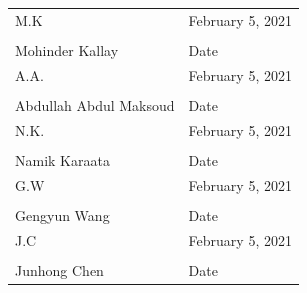 \documentclass[]{article}
\begin{document}
	\noindent\begin{tabular}{ll}\\
	M.K & February 5, 2021 \\
	\makebox[2.5in]{\hrulefill} & \makebox[2.5in]			{\hrulefill}\\
	Mohinder Kallay & Date\\[8ex]%
	A.A. & February 5, 2021 \\
	\makebox[2.5in]{\hrulefill} & \makebox[2.5in]			{\hrulefill}\\
	Abdullah Abdul Maksoud & Date\\[8ex]
	N.K. & February 5, 2021 \\
	\makebox[2.5in]{\hrulefill} &  \makebox[2.5in]			{\hrulefill}\\
	Namik Karaata & Date\\[8ex]
	G.W & February 5, 2021 \\
	\makebox[2.5in]{\hrulefill} & \makebox[2.5in]			{\hrulefill}\\
	Gengyun Wang & Date\\[8ex]
	J.C & February 5, 2021 \\
	\makebox[2.5in]{\hrulefill} & \makebox[2.5in]			{\hrulefill}\\
	Junhong Chen & Date\\
	\end{tabular}
\end{document}
